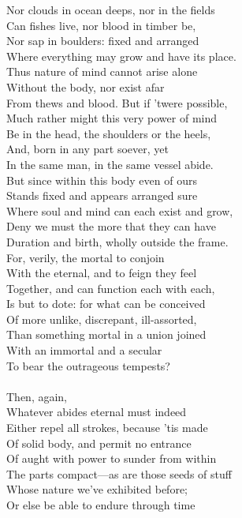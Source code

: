 Nor clouds in ocean deeps, nor in the fields\\
Can fishes live, nor blood in timber be,\\
Nor sap in boulders: fixed and arranged\\
Where everything may grow and have its place.\\
Thus nature of mind cannot arise alone\\
Without the body, nor exist afar\\
From thews and blood. But if 'twere possible,\\
Much rather might this very power of mind\\
Be in the head, the shoulders or the heels,\\
And, born in any part soever, yet\\
In the same man, in the same vessel abide.\\
But since within this body even of ours\\
Stands fixed and appears arranged sure\\
Where soul and mind can each exist and grow,\\
Deny we must the more that they can have\\
Duration and birth, wholly outside the frame.\\
For, verily, the mortal to conjoin\\
With the eternal, and to feign they feel\\
Together, and can function each with each,\\
Is but to dote: for what can be conceived\\
Of more unlike, discrepant, ill-assorted,\\
Than something mortal in a union joined\\
With an immortal and a secular\\
To bear the outrageous tempests?\\
\\
Then, again,\\
Whatever abides eternal must indeed\\
Either repel all strokes, because 'tis made\\
Of solid body, and permit no entrance\\
Of aught with power to sunder from within\\
The parts compact—as are those seeds of stuff\\
Whose nature we've exhibited before;\\
Or else be able to endure through time\\
